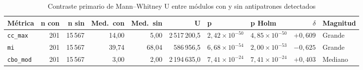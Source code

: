 \begin{table}[t]
\centering
\footnotesize
\setlength{\tabcolsep}{4pt}
\caption{Contraste primario de Mann--Whitney U entre módulos con y sin antipatrones detectados}
\label{tab:mann-whitney}
\begin{tabularx}{\textwidth}{@{}X r r r r r l l r l@{}}
\toprule
\textbf{Métrica} & \textbf{n con} & \textbf{n sin} & \textbf{Med.\ con} & \textbf{Med.\ sin} & \textbf{U} & \textbf{p} & \textbf{p Holm} & \textbf{$\delta$} & \textbf{Magnitud} \\
\midrule
\texttt{cc\_max} & 201 & 15\,567 & 14,00 & 5,00 & 2\,517\,200,5 & $2{,}42 \times 10^{-50}$ & $4{,}85 \times 10^{-50}$ & $+0{,}609$ & Grande \\
\texttt{mi} & 201 & 15\,567 & 39,74 & 68,04 & 586\,956,5 & $6{,}68 \times 10^{-54}$ & $2{,}00 \times 10^{-53}$ & $-0{,}625$ & Grande \\
\texttt{cbo\_mod} & 201 & 15\,567 & 3,00 & 2,00 & 2\,194\,635,0 & $7{,}41 \times 10^{-24}$ & $7{,}41 \times 10^{-24}$ & $+0{,}403$ & Mediano \\
\bottomrule
\end{tabularx}
\end{table}